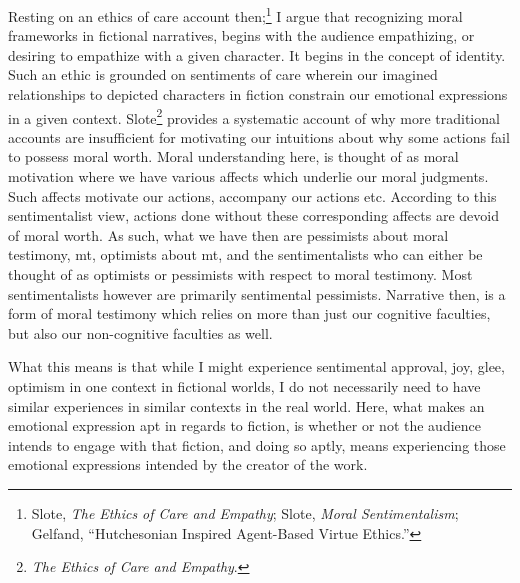 \documentclass[phdthesis,12pt,final]{wuthesis}
\theoremstyle{definition}
\theoremstyle{definition}
\theoremstyle{definition}
\theoremstyle{definition}
\theoremstyle{remark}
\begin{document}
Resting on an ethics of care account then;\footnote{Slote, \emph{The {Ethics} of {Care} and {Empathy}}; Slote, \emph{Moral {Sentimentalism}}; Gelfand, {``Hutchesonian Inspired Agent-Based Virtue Ethics.''}} I argue that recognizing moral frameworks in fictional narratives, begins with the audience empathizing, or desiring to empathize with a given character. It begins in the concept of identity. Such an ethic is grounded on sentiments of care wherein our imagined relationships to depicted characters in fiction constrain our emotional expressions in a given context. Slote\footnote{\emph{The {Ethics} of {Care} and {Empathy}}.} provides a systematic account of why more traditional accounts are insufficient for motivating our intuitions about why some actions fail to possess moral worth. Moral understanding here, is thought of as moral motivation where we have various affects which underlie our moral judgments. Such affects motivate our actions, accompany our actions etc. According to this sentimentalist view, actions done without these corresponding affects are devoid of moral worth. As such, what we have then are pessimists about moral testimony, mt, optimists about mt, and the sentimentalists who can either be thought of as optimists or pessimists with respect to moral testimony. Most sentimentalists however are primarily sentimental pessimists. Narrative then, is a form of moral testimony which relies on more than just our cognitive faculties, but also our non-cognitive faculties as well.

What this means is that while I might experience sentimental approval, joy, glee, optimism in one context in fictional worlds, I do not necessarily need to have similar experiences in similar contexts in the real world. Here, what makes an emotional expression apt in regards to fiction, is whether or not the audience intends to engage with that fiction, and doing so aptly, means experiencing those emotional expressions intended by the creator of the work.
\end{document}
